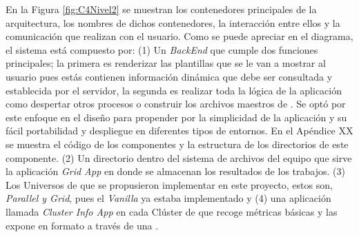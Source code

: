 En la Figura \ref{fig:C4Nivel2} se muestran los contenedores principales de la arquitectura, los nombres de dichos contenedores, la interacción entre ellos y la comunicación que realizan con el usuario. Como se puede apreciar en el diagrama, el sistema está compuesto por: (1) Un \textit{BackEnd} que cumple dos funciones principales; la primera es renderizar las plantillas que se le van a mostrar al usuario pues estás contienen información dinámica que debe ser consultada y establecida por el servidor, la segunda es realizar toda la lógica de la aplicación como despertar otros procesos o construir los archivos maestros de \HTCondor. Se optó por este enfoque en el diseño para propender por la simplicidad de la aplicación y su fácil portabilidad y despliegue en diferentes tipos de entornos. En el Apéndice XX se muestra el código de los componentes y la estructura de los directorios de este componente. (2) Un directorio dentro del sistema de archivos del equipo que sirve la aplicación \textit{Grid App} en donde se almacenan los resultados de los trabajos. (3) Los Universos de \HTCondor que se propusieron implementar en este proyecto, estos son, \textit{Parallel y Grid}, pues el \textit{Vanilla} ya estaba implementado y (4) una aplicación llamada \textit{Cluster Info App} en cada Clúster de \HTCondor que recoge métricas básicas y las expone en formato \JSON a través de una \API.

